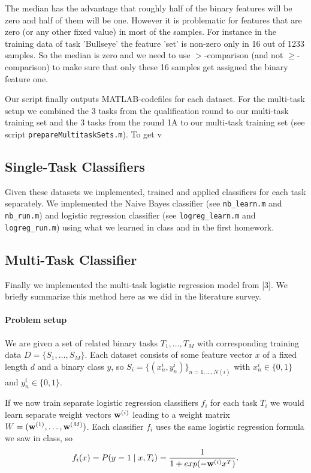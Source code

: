 The median has the advantage that roughly half of the binary features will be zero and half of them will be one. 
However it is problematic for features that are zero (or any other fixed value) in most of the samples. For instance  in the training data of task 'Bullseye' the feature 'set' is non-zero only in 16 out of 1233 samples. So the median is zero and we need to use $>$-comparison (and not $\geq$-comparison) to make sure that only these 16 samples get assigned the binary feature one.

Our script finally outputs MATLAB-codefiles for each dataset. For the multi-task setup we combined the 3 tasks from the qualification round to our multi-task training set and the 3 tasks from the round 1A to our multi-task training set (see script \texttt{prepareMultitaskSets.m}). To get v

\subsection*{Single-Task Classifiers}
Given these datasets we implemented, trained and applied classifiers for each task separately.
We implemented the Naive Bayes classifier (see \texttt{nb\_learn.m} and \texttt{nb\_run.m}) and logistic regression classifier (see \texttt{logreg\_learn.m} and \texttt{logreg\_run.m}) using what we learned in class and in the first homework.

\subsection*{Multi-Task Classifier}
Finally we implemented the multi-task logistic regression model from [3]. We briefly summarize this method here as we did in the literature survey.

\paragraph{Problem setup}
We are given a set of related binary tasks $T_1, \dots, T_M$ with corresponding training data $D = \{S_1, \dots, S_M\}$. Each dataset consists of some feature vector $x$ of a fixed length $d$ and a binary class $y$, so $S_i = \{(x_n^i, y_n^i)\}_{n=1,\dots,N(i)}$ with $x_n^i \in \{0,1\}$ and $y_n^i \in \{0,1\}$.

If we now train separate logistic regression classifiers $f_i$ for each task $T_i$ we would learn separate weight vectors $\textbf{w}^{(i)}$ leading to a weight matrix $W = (\textbf{w}^{(1)}, \dots, \textbf{w}^{(M)})$. Each classifier $f_i$ uses the same logistic regression formula we saw in class, so
\begin{align*}
f_i(x) = P(y=1 \mid x, T_i) = \frac{1}{1+exp(-\textbf{w}^{(i)} x^T)}.
\end{align*}

